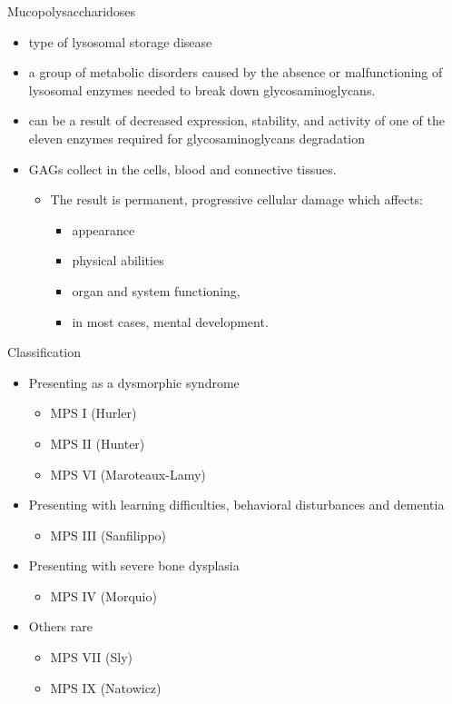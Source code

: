 \documentclass[presentation, smaller]{beamer}
\begin{document}
\begin{frame}[label={sec:orgea366f4}]{Mucopolysaccharidoses}
\begin{itemize}
\item type of lysosomal storage disease
\item a group of metabolic disorders caused by the absence or
malfunctioning of lysosomal enzymes needed to break down
glycosaminoglycans.
\item can be a result of decreased expression, stability, and activity of
one of the eleven enzymes required for glycosaminoglycans
degradation
\item GAGs collect in the cells, blood and connective tissues.
\begin{itemize}
\item The result is permanent, progressive cellular damage which affects:
\begin{itemize}
\item appearance
\item physical abilities
\item organ and system functioning,
\item in most cases, mental development.
\end{itemize}
\end{itemize}
\end{itemize}
\end{frame}

\begin{frame}[label={sec:orga4c39d6}]{Classification}
\begin{itemize}
\item Presenting as a dysmorphic syndrome
\begin{itemize}
\item MPS I (Hurler)
\item MPS II (Hunter)
\item MPS VI (Maroteaux-Lamy)
\end{itemize}
\item Presenting with learning difficulties, behavioral disturbances and dementia
\begin{itemize}
\item MPS III (Sanfilippo)
\end{itemize}
\item Presenting with severe bone dysplasia
\begin{itemize}
\item MPS IV (Morquio)
\end{itemize}
\item Others rare
\begin{itemize}
\item MPS VII (Sly)
\item MPS IX (Natowicz)
\end{itemize}
\end{itemize}
\end{frame}
\end{document}
